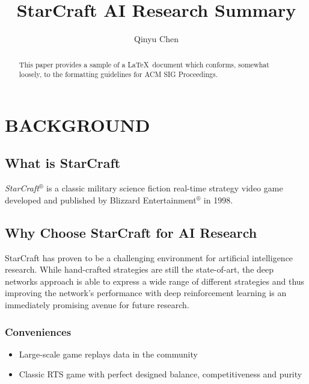 \documentclass[sigconf]{acmart}
\begin{document}
\title{StarCraft AI Research Summary}

\author{Qinyu Chen}

\begin{abstract}
This paper provides a sample of a \LaTeX\ document which conforms, somewhat loosely, to the formatting guidelines for
ACM SIG Proceedings.
\end{abstract}


\maketitle


\section{BACKGROUND}
\subsection{What is StarCraft}
\emph{StarCraft}$^\circledR$ is a classic military science fiction real-time strategy video game developed and published by Blizzard Entertainment$^\circledR$ in 1998.
\subsection{Why Choose StarCraft for AI Research}
StarCraft has proven to be a challenging environment for artificial intelligence research. While hand-crafted strategies are still the state-of-art, the deep networks approach is able to express a wide range of different strategies and thus improving the network’s performance with deep reinforcement learning is an immediately promising avenue for future research.\cite{DBLP:journals/corr/JustesenR17}
\subsubsection{Conveniences}
\begin{itemize}
\item Large-scale game replays data in the community
\item Classic RTS game with perfect designed balance, competitiveness and purity
\end{itemize}
\end{document}
